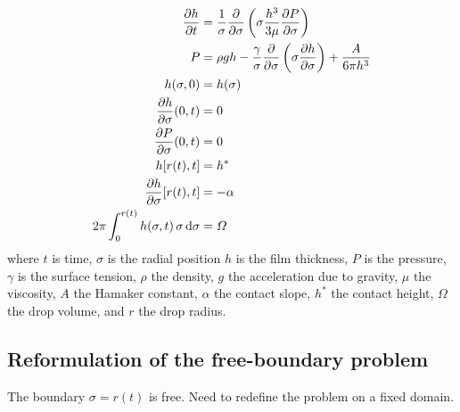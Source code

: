\documentclass[12pt]{article}
\numberwithin{equation}{section}
\begin{document}
\begin{align}
	\frac{\partial h}{\partial t} &=  \frac{1}{\sigma} \frac{\partial }{\partial \sigma}  \left( \sigma \frac{h^3}{3\mu} \frac{\partial P}{\partial \sigma} \right)
	\\
	P &
	= \rho g h - \frac{\gamma}{\sigma}\frac{\partial }{\partial \sigma} \left( \sigma \frac{\partial h}{\partial \sigma} \right)  + \frac{A}{6 \pi h^3}
	\\
	h(\sigma,0) &= h(\sigma)
	\\
	\frac{\partial h}{\partial \sigma} (0,t) &= 0
	\\
	\frac{\partial P}{\partial \sigma}(0,t) &=0
	\\
	h[r(t),t] &= h^*
	\\
	\frac{\partial h}{\partial \sigma}[r(t),t] &= -\alpha
	\\
	2 \pi \int_0^{r(t)} h(\sigma,t) \, \sigma \, \mathrm{d}\sigma &= \mit{\Omega}
\end{align}
where $t$ is time, $\sigma$ is the radial position $h$ is the film thickness, $P$ is the pressure, $\gamma$ is the surface tension, $\rho$ the density, $g$ the acceleration due to gravity, $\mu$ the viscosity, $A$ the Hamaker constant, $\alpha$ the contact slope, $h^*$ the contact height, $\Omega$ the drop volume, and $r$ the drop radius.

\subsection{Reformulation of the free-boundary problem}

The boundary $\sigma = r(t)$ is free. Need to redefine the problem on a fixed domain.
\end{document}
